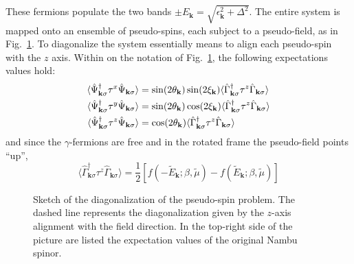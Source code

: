These fermions populate the two bands $\pm E_\mathbf{k} = \sqrt{\epsilon_\mathbf{k}^2 + \Delta^2}$. The entire system is mapped onto an ensemble of pseudo-spins, each subject to a pseudo-field, as in Fig.~\ref{fig:pseudo-magnetic-field}. To diagonalize the system essentially means to align each pseudo-spin with the $z$ axis. Within on the notation of Fig.~\ref{fig:pseudo-magnetic-field}, the following expectations values hold:
\begin{align}
	\langle \hat \Psi_{\mathbf{k}\sigma}^\dagger \tau^x \hat \Psi_{\mathbf{k}\sigma} \rangle &= \sin \normalfont(2\theta_\mathbf{k}) \sin \normalfont(2\xi_\mathbf{k}) \langle \hat \Gamma_{\mathbf{k}\sigma}^\dagger \tau^z \hat \Gamma_{\mathbf{k}\sigma} \rangle \label{eq:af-x-expectation}\\
	\langle \hat \Psi_{\mathbf{k}\sigma}^\dagger \tau^y \hat \Psi_{\mathbf{k}\sigma} \rangle &= \sin \normalfont(2\theta_\mathbf{k}) \cos \normalfont(2\xi_\mathbf{k}) \langle \hat \Gamma_{\mathbf{k}\sigma}^\dagger \tau^z \hat \Gamma_{\mathbf{k}\sigma} \rangle \label{eq:af-y-expectation}\\
	\langle \hat \Psi_{\mathbf{k}\sigma}^\dagger \tau^z \hat \Psi_{\mathbf{k}\sigma} \rangle &= \cos \normalfont(2\theta_\mathbf{k}) \langle \hat \Gamma_{\mathbf{k}\sigma}^\dagger \tau^z \hat \Gamma_{\mathbf{k}\sigma} \rangle \label{eq:af-z-expectation}
\end{align}
and since the $\gamma$-fermions are free and in the rotated frame the pseudo-field points ``up'',
\[
	\langle \hat \Gamma_{\mathbf{k}\sigma}^\dagger \tau^z \hat \Gamma_{\mathbf{k}\sigma} \rangle = \frac{1}{2} \left[
		f\left(
			-\tilde{E}_\mathbf{k};\beta,\tilde{\mu}
		\right) - f\left(
			\tilde{E}_\mathbf{k};\beta,\tilde{\mu}
		\right)
	\right]
\]

\begin{figure}
	\centering
	
	\caption{Sketch of the diagonalization of the pseudo-spin problem. The dashed line represents the diagonalization given by the $z$-axis alignment with the field direction. In the top-right side of the picture are listed the expectation values of the original Nambu spinor.}
	\label{fig:pseudo-magnetic-field}
\end{figure}

